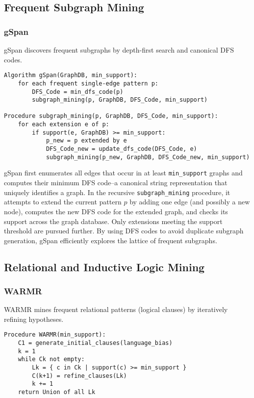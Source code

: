\documentclass{article}
\begin{document}
\subsection{Frequent Subgraph Mining}

\subsubsection{gSpan}

gSpan \cite{yan2002gspan} discovers frequent subgraphs by depth-first search and canonical DFS codes.

\begin{verbatim}
Algorithm gSpan(GraphDB, min_support):
    for each frequent single-edge pattern p:
        DFS_Code = min_dfs_code(p)
        subgraph_mining(p, GraphDB, DFS_Code, min_support)

Procedure subgraph_mining(p, GraphDB, DFS_Code, min_support):
    for each extension e of p:
        if support(e, GraphDB) >= min_support:
            p_new = p extended by e
            DFS_Code_new = update_dfs_code(DFS_Code, e)
            subgraph_mining(p_new, GraphDB, DFS_Code_new, min_support)
\end{verbatim}

gSpan first enumerates all edges that occur in at least \texttt{min\_support} graphs and computes their minimum DFS code--a canonical string representation that uniquely identifies a graph.  In the recursive \texttt{subgraph\_mining} procedure, it attempts to extend the current pattern \(p\) by adding one edge (and possibly a new node), computes the new DFS code for the extended graph, and checks its support across the graph database.  Only extensions meeting the support threshold are pursued further.  By using DFS codes to avoid duplicate subgraph generation, gSpan efficiently explores the lattice of frequent subgraphs.

\subsection{Relational and Inductive Logic Mining}

\subsubsection{WARMR}

WARMR \cite{dehaspe1999frequent} mines frequent relational patterns (logical clauses) by iteratively refining hypotheses.

\begin{verbatim}
Procedure WARMR(min_support):
    C1 = generate_initial_clauses(language_bias)
    k = 1
    while Ck not empty:
        Lk = { c in Ck | support(c) >= min_support }
        C(k+1) = refine_clauses(Lk)
        k += 1
    return Union of all Lk
\end{verbatim}
\end{document}
